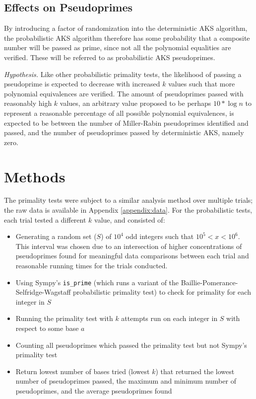 \documentclass{article}
\begin{document}
\subsection{Effects on Pseudoprimes}
By introducing a factor of randomization into the deterministic AKS algorithm, the probabilistic AKS algorithm therefore has some probability that a composite number will be passed as prime, since not all the polynomial equalities are verified. These will be referred to as probabilistic AKS pseudoprimes.

\emph{Hypothesis.} Like other probabilistic primality tests, the likelihood of passing a pseudoprime is expected to decrease with increased $k$ values such that more polynomial equivalences are verified. The amount of pseudoprimes passed with reasonably high $k$ values, an arbitrary value proposed to be perhaps $10 * \log{n}$ to represent a reasonable percentage of all possible polynomial equivalences, is expected to be between the number of Miller-Rabin pseudoprimes identified and passed, and the number of pseudoprimes passed by deterministic AKS, namely zero.

\section{Methods}
The primality tests were subject to a similar analysis method over multiple trials; the raw data is available in Appendix \ref{appendix:data}. For the probabilistic tests, each trial tested a different $k$ value, and consisted of:

\begin{itemize}
    \item{Generating a random set ($S$) of $10^4$ odd integers such that $10^5 < x < 10^6$. This interval was chosen due to an intersection of higher concentrations of pseudoprimes found for meaningful data comparisons between each trial and reasonable running times for the trials conducted.}
    \item{Using Sympy's \texttt{is\_prime} (which runs a variant of the Baillie-Pomerance-Selfridge-Wagstaff probabilistic primality test) to check for primality for each integer in $S$}
    \item{Running the primality test with $k$ attempts run on each integer in $S$ with respect to some base $a$}
    \item{Counting all pseudoprimes which passed the primality test but not Sympy's primality test}
    \item{Return lowest number of bases tried (lowest $k$) that returned the lowest number of pseudoprimes passed, the maximum and minimum number of pseudoprimes, and the average pseudoprimes found}
\end{itemize}
\end{document}
